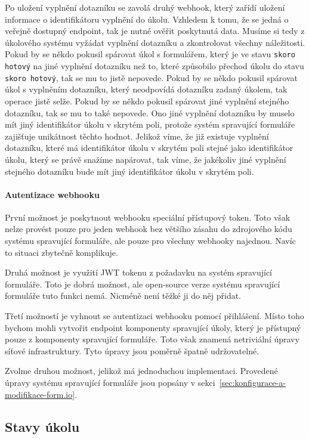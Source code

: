 Po uložení vyplnění dotazníku se zavolá druhý webhook, který zařídí uložení informace o identifikátoru vyplnění do úkolu.
Vzhledem k tomu, že se jedná o veřejně dostupný endpoint, tak je nutné ověřit poskytnutá data.
Musíme si tedy z úkolového systému vyžádat vyplnění dotazníku a zkontrolovat všechny náležitosti.
Pokud by se někdo pokusil spárovat úkol s formulářem, který je ve stavu \texttt{skoro hotový} na jiné vyplnění dotazníku než to, které způsobilo přechod úkolu do stavu \texttt{skoro hotový}, tak se mu to jistě nepovede.
Pokud by se někdo pokusil spárovat úkol s vyplněním dotazníku, který neodpovídá dotazníku zadaný úkolem, tak operace jistě selže.
Pokud by se někdo pokusil spárovat jiné vyplnění stejného dotazníku, tak se mu to také nepovede.
Ono jiné vyplnění dotazníku by muselo mít jiný identifikátor úkolu v skrytém poli, protože systém spravující formuláře zajišťuje unikátnost těchto hodnot.
Jelikož víme, že již existuje vyplnění dotazníku, které má identifikátor úkolu v skrytém poli stejné jako identifikátor úkolu, který se právě snažíme napárovat, tak víme, že jakékoliv jiné vyplnění stejného dotazníku bude mít jiný identifikátor úkolu v skrytém poli.

\paragraph{Autentizace webhooku}

První možnost je poskytnout webhooku speciální přístupový token.
Toto však nelze provést pouze pro jeden webhook bez většího zásahu do zdrojového kódu systému spravující formuláře, ale pouze pro všechny webhooky najednou.
Navíc to situaci zbytečně komplikuje.

Druhá možnost je využití JWT tokenu z požadavku na systém spravující formuláře.
Toto je dobrá možnost, ale open-source verze systému spravující formuláře tuto funkci nemá.
Nicméně není těžké ji do něj přidat.

Třetí možností je vyhnout se autentizaci webhooku pomocí přihlášení.
Místo toho bychom mohli vytvořit endpoint komponenty spravující úkoly, který je přístupný pouze z komponenty spravující formuláře.
Toto však znamená netriviální úpravy síťové infrastruktury.
Tyto úpravy jsou poměrně špatně udržovatelné.

Zvolme druhou možnost, jelikož má jednoduchou implementaci.
Provedené úpravy systému spravující formuláře jsou popsány v sekci~\ref{sec:konfigurace-a-modifikace-form.io}.

\subsection{Stavy úkolu}\label{subsec:stavy-ukolu}

